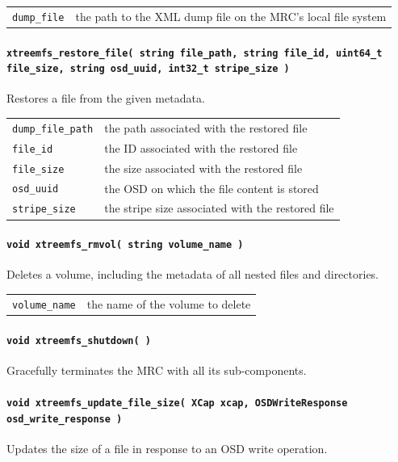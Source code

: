 \begin{tabularx}{\textwidth}{lX}
 \texttt{dump\_file} & the path to the XML dump file on the MRC's\index{MRC} local file system
\end{tabularx}

\paragraph{\texttt{xtreemfs\_restore\_file( string file\_path, string file\_id, uint64\_t file\_size, string osd\_uuid, int32\_t stripe\_size )}}
Restores a file from the given metadata.

\begin{tabularx}{\textwidth}{lX}
 \texttt{dump\_file\_path} & the path associated with the restored file\\
 \texttt{file\_id} & the ID associated with the restored file\\
 \texttt{file\_size} & the size associated with the restored file\\
 \texttt{osd\_uuid} & the OSD\index{OSD} on which the file content is stored\\
 \texttt{stripe\_size} & the stripe size associated with the restored file\\
\end{tabularx}

\paragraph{\texttt{void xtreemfs\_rmvol( string volume\_name )}}
Deletes a volume, including the metadata of all nested files and directories.

\begin{tabularx}{\textwidth}{lX}
 \texttt{volume\_name} & the name of the volume to delete\\
\end{tabularx}

\paragraph{\texttt{void xtreemfs\_shutdown( )}}
Gracefully terminates the MRC with all its sub-components.

\paragraph{\texttt{void xtreemfs\_update\_file\_size( XCap xcap, OSDWriteResponse osd\_write\_response~)}}
Updates the size of a file in response to an OSD write operation.

